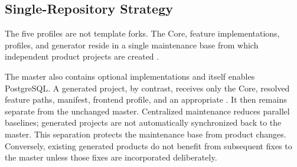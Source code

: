 \subsection{Single-Repository Strategy}
\label{subsec:single-repository-strategie}

The five profiles are not template forks. The Core, feature implementations,
profiles, and generator reside in a single maintenance base from which
independent product projects are created
\parencite{kleiveist2026profiles,kleiveist2026governance-snapshot}.

The master also contains optional implementations and itself enables
PostgreSQL. A generated project, by contrast, receives only the Core, resolved
feature paths, manifest, frontend profile, and an appropriate
. It then remains separate from the unchanged master.
Centralized maintenance reduces parallel baselines; generated projects are not
automatically synchronized back to the master.
This separation protects the maintenance base from product changes.
Conversely, existing generated products do not benefit from subsequent fixes
to the master unless those fixes are incorporated deliberately.
